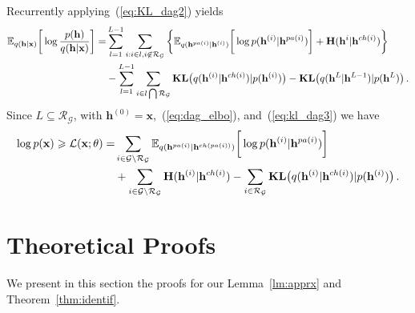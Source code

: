 \documentclass[twoside]{article}
\begin{document}
Recurrently applying~(\ref{eq:KL_dag2}) yields
\begin{align} \label{eq:kl_dag3}
 \mathbb{E}_{q(\mathbf{h} | \mathbf{x})} \bigg[ \log  \frac{p( \mathbf{h})}{q(\mathbf{h}|\mathbf{x})}  \bigg] =& \sum_{l=1}^{L-1}   \sum_{i:i\in l, i \not\in   \mathcal{R}_{ \mathcal{G}}  }  \bigg\{ \mathbb{E}_{q(\mathbf{h}^{pa(i)}|\mathbf{h}^{(i)})} \bigg[ \log p( \mathbf{h}^{(i)}|  \mathbf{h}^{pa(i)})   \bigg]  +    \textbf{\text{H}}(\mathbf{h}^i | \mathbf{h}^{ch(i)} )  \bigg\} \\ \notag
& -   \sum_{l=1}^{L-1}  \sum_{i \in l \bigcap \mathcal{R}_{ \mathcal{G} }  }  \textbf{\text{KL}}\big(q(\mathbf{h}^{(i)} | \mathbf{h}^{ch(i)} )   | p(\mathbf{h}^{(i)})  \big)   -   \textbf{\text{KL}}\big(q(\mathbf{h}^L | \mathbf{h}^{L-1} )   | p(\mathbf{h}^L)  \big) \, .
 \end{align}
Since $L  \subseteq   \mathcal{R}_{ \mathcal{G}} $,  with $\mathbf{h}^{(0)} = \mathbf{x}$,~(\ref{eq:dag_elbo}), and~(\ref{eq:kl_dag3}) we have 
\begin{align*}  
 \log p(\mathbf{x}) \geqslant  \mathcal{L}(\mathbf{x}; \theta) =&   \sum_{i \in \mathcal{G}  \setminus  \mathcal{R}_{ \mathcal{G} }  }  \mathbb{E}_{q(\mathbf{h}^{pa(i)}|\mathbf{h}^{ch(pa(i))})} \bigg[ \log p( \mathbf{h}^{(i)}|  \mathbf{h}^{pa(i)})   \bigg]  \\
 & +  \sum_{i \in \mathcal{G}  \setminus  \mathcal{R}_{ \mathcal{G} }  } \textbf{\text{H}}(\mathbf{h}^{(i)} | \mathbf{h}^{ch(i)} )   -    \sum_{i \in  \mathcal{R}_{ \mathcal{G} }  }  \textbf{\text{KL}}\big(q(\mathbf{h}^{(i)} | \mathbf{h}^{ch(i)} )   | p(\mathbf{h}^{(i)})  \big)  \, .
 \end{align*}




\section{Theoretical Proofs}
We present in this section the proofs for our Lemma~\ref{lm:apprx} and Theorem~\ref{thm:identif}.
\end{document}
